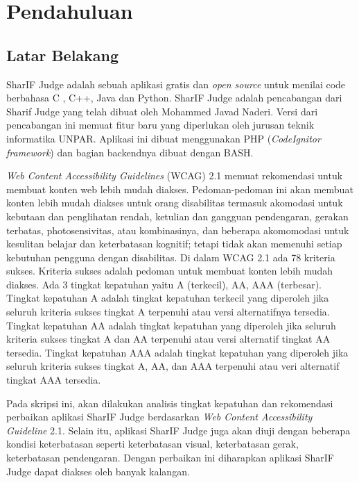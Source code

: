 \chapter{Pendahuluan}
\label{chap:intro}
   
\section{Latar Belakang}
\label{sec:label}
SharIF Judge adalah sebuah aplikasi gratis dan \textit{open source} untuk menilai code berbahasa C , C++, Java dan Python. SharIF Judge adalah pencabangan dari Sharif Judge yang telah dibuat oleh Mohammed Javad Naderi. Versi dari pencabangan ini memuat fitur baru yang diperlukan oleh jurusan teknik informatika UNPAR. Aplikasi ini dibuat menggunakan PHP (\textit{CodeIgnitor framework}) dan bagian backendnya dibuat dengan BASH.

\textit{Web Content Accessibility Guidelines} (WCAG) 2.1 memuat rekomendasi untuk membuat konten web lebih mudah diakses. Pedoman-pedoman ini akan membuat konten lebih mudah diakses untuk orang disabilitas termasuk akomodasi untuk kebutaan dan penglihatan rendah, ketulian dan gangguan pendengaran, gerakan terbatas, photosensivitas, atau kombinasinya, dan beberapa akomomodasi untuk kesulitan belajar dan keterbatasan kognitif; tetapi tidak akan memenuhi setiap kebutuhan pengguna dengan disabilitas. Di dalam WCAG 2.1 ada 78 kriteria sukses. Kriteria sukses adalah pedoman untuk membuat konten lebih mudah diakses. Ada 3 tingkat kepatuhan yaitu A (terkecil), AA, AAA (terbesar). Tingkat kepatuhan A adalah tingkat kepatuhan terkecil yang diperoleh jika seluruh kriteria sukses tingkat A terpenuhi atau versi alternatifnya tersedia. Tingkat kepatuhan AA adalah tingkat kepatuhan yang diperoleh jika seluruh kriteria sukses tingkat A dan AA terpenuhi atau versi alternatif tingkat AA tersedia. Tingkat kepatuhan AAA adalah tingkat kepatuhan yang diperoleh jika seluruh kriteria sukses tingkat A, AA, dan AAA terpenuhi atau veri alternatif tingkat AAA tersedia.

Pada skripsi ini, akan dilakukan analisis tingkat kepatuhan dan rekomendasi perbaikan aplikasi SharIF Judge berdasarkan \textit{Web Content Accessibility Guideline} 2.1. Selain itu, aplikasi SharIF Judge juga akan diuji dengan beberapa kondisi keterbatasan seperti keterbatasan visual, keterbatasan gerak, keterbatasan pendengaran. Dengan perbaikan ini diharapkan aplikasi SharIF Judge dapat diakses oleh banyak kalangan.

